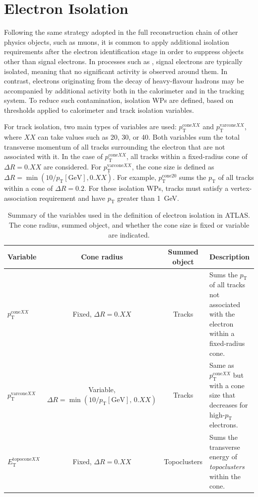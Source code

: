 \section{Electron Isolation}
\label{electron_iso}

Following the same strategy adopted in the full reconstruction chain of other physics objects, such as muons, it is common to apply additional isolation requirements after the electron identification stage in order to suppress objects other than signal electrons. In processes such as \zee, signal electrons are typically isolated, meaning that no significant activity is observed around them. In contrast, electrons originating from the decay of heavy-flavour hadrons may be accompanied by additional activity both in the calorimeter and in the tracking system. To reduce such contamination, isolation WPs are defined, based on thresholds applied to calorimeter and track isolation variables.

For track isolation, two main types of variables are used: $p_{\mathrm{T}}^{\mathrm{cone}XX}$ and $p_{\mathrm{T}}^{\mathrm{varcone}XX}$, where $XX$ can take values such as 20, 30, or 40. Both variables sum the total transverse momentum of all tracks surrounding the electron that are not associated with it. In the case of $p_{\mathrm{T}}^{\mathrm{cone}XX}$, all tracks within a fixed-radius cone of $\Delta R = 0.XX$ are considered. For $p_{\mathrm{T}}^{\mathrm{varcone}XX}$, the cone size is defined as $\Delta R = \min(10/p_{\mathrm{T}}[\text{GeV}], 0.XX)$. For example, $p_{\mathrm{T}}^{\mathrm{cone20}}$ sums the $p_{\mathrm{T}}$ of all tracks within a cone of $\Delta R = 0.2$. For these isolation WPs, tracks must satisfy a vertex-association requirement and have $p_{\mathrm{T}}$ greater than 1~GeV.

\begin{table}[htbp]
  \scriptsize
  \centering
  \caption{Summary of the variables used in the definition of electron isolation in ATLAS. The cone radius, summed object, and whether the cone size is fixed or variable are indicated.}
  \renewcommand{\arraystretch}{1.2} %
  \begin{tabular}{lccp{3cm}}
  \hline
  \textbf{Variable} & \textbf{Cone radius} & \textbf{Summed object} & \textbf{Description} \\
  \hline
  $p_{\mathrm{T}}^{\mathrm{cone}XX}$ & Fixed, $\Delta R = 0.XX$ & Tracks & Sums the $p_{\mathrm{T}}$ of all tracks not associated with the electron within a fixed-radius cone. \\
  $p_{\mathrm{T}}^{\mathrm{varcone}XX}$ & Variable, $\Delta R = \min(10/p_{\mathrm{T}}[\text{GeV}],\,0.XX)$ & Tracks & Same as $p_{\mathrm{T}}^{\mathrm{cone}XX}$ but with a cone size that decreases for high-$p_{\mathrm{T}}$ electrons. \\
  $E_{\mathrm{T}}^{\mathrm{topocone}XX}$ & Fixed, $\Delta R = 0.XX$ & Topoclusters & Sums the transverse energy of \textit{topoclusters} within the cone. \\
  \hline
  \end{tabular}
  \label{tab:electron_isolation_vars}
  \end{table}

